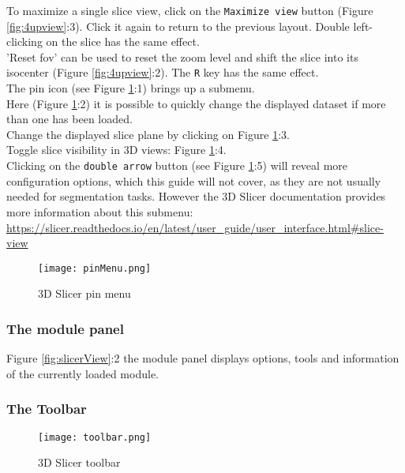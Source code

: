 \noindent
To maximize a single slice view, click on the \texttt{Maximize view} button (Figure \ref{fig:4upview}:3). Click it again to return to the previous layout. Double left-clicking on the slice has the same effect.\\

\noindent
'Reset \gls{fov}' can be used to reset the zoom level and shift the slice into its isocenter (Figure \ref{fig:4upview}:2). The \texttt{R} key has the same effect.\\

\noindent
The pin icon (see Figure \ref{fig:pinMenu}:1) brings up a submenu.\\
\noindent
Here (Figure \ref{fig:pinMenu}:2) it is possible to quickly change the displayed dataset if more than one has been loaded.\\
Change the displayed slice plane by clicking on Figure \ref{fig:pinMenu}:3.\\
Toggle slice visibility in 3D views: Figure \ref{fig:pinMenu}:4.\\
Clicking on the \texttt{double arrow} button (see Figure \ref{fig:pinMenu}:5) will reveal more configuration options, which this guide will not cover, as they are not usually needed for segmentation tasks. However the 3D Slicer documentation provides more information about this submenu: \url{https://slicer.readthedocs.io/en/latest/user_guide/user_interface.html#slice-view}
\begin{figure}[h!] %
	\centerline{ %
		\texttt{[image: pinMenu.png]}}
	\caption{3D Slicer pin menu}\label{fig:pinMenu}
\end{figure}
\pagebreak

\subsubsection{The module panel}
Figure \ref{fig:slicerView}:2 the module panel displays options, tools and information of the currently loaded module.

\subsubsection{The Toolbar}
\begin{figure}[h!] %
	\centerline{ %
		\texttt{[image: toolbar.png]}}
	\caption{3D Slicer toolbar}\label{fig:toolbar}
\end{figure}

